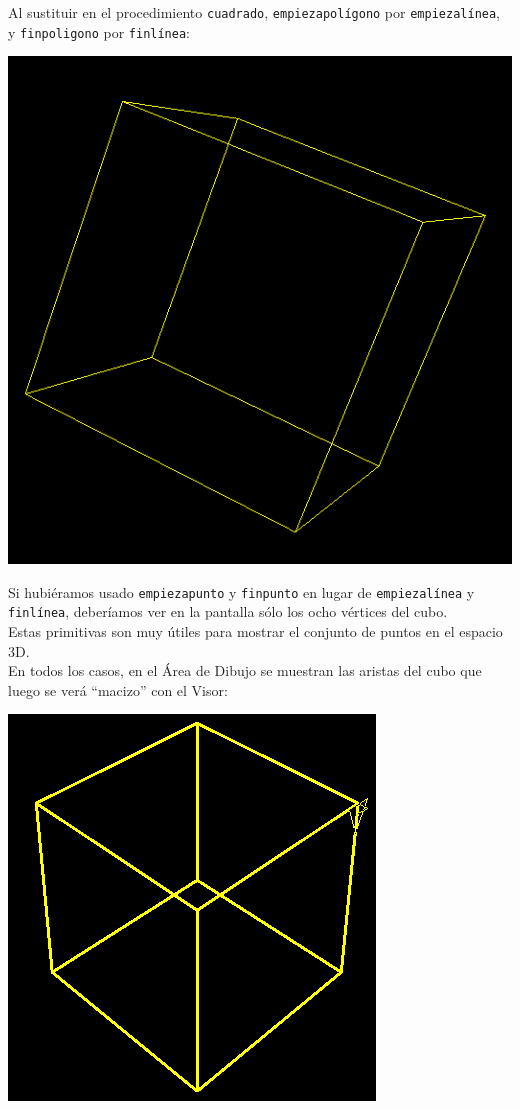 Al sustituir en el procedimiento \verb+cuadrado+, \texttt{empiezapol\'igono}
por \texttt{empiezal\'inea}, y \texttt{finpoligono} por \texttt{finl\'inea}:
\begin{center}
   \includegraphics[scale=0.2]{Imagenes/05_Primitivas/3dCube2.png}
\end{center}

Si hubi\'eramos usado \texttt{empiezapunto} y \texttt{finpunto} en lugar de
\texttt{empiezal\'inea} y \texttt{finl\'inea}, deber\'iamos ver en la pantalla
s\'olo los ocho v\'ertices del cubo. \\

\noindent Estas primitivas son muy \'utiles para mostrar el conjunto de puntos
en el espacio 3D. \\

\noindent En todos los casos, en el \'Area de Dibujo se muestran las aristas
del cubo que luego se ver\'a ``macizo'' con el Visor:
\begin{center}
   \includegraphics[scale=0.3]{Imagenes/05_Primitivas/CuboSimple03.png}
\end{center}

